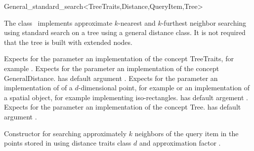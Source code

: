 

\begin{ccRefClass}{General_standard_search<TreeTraits,Distance,QueryItem,Tree>}  %


\ccDefinition
  
The class \ccRefName\ implements approximate $k$-nearest and $k$-furthest neighbor searching
using standard search on a tree using a general distance 
class. It is not required that the tree is built with extended nodes.


\ccParameters

Expects for the parameter  an implementation of the concept TreeTraits,
for example .
Expects for the parameter  an implementation of the
concept GeneralDistance.  has default argument 
.
Expects for the parameter   an implementation of
of a $d$-dimensional point, for example 
or an implementation of a spatial object, for
example  implementing iso-rectangles.
 has default argement .
Expects for the parameter  an implementation of the concept Tree.
 has default argument .

\ccTypes


\ccCreation
{}  %

{Constructor for searching approximately $k$ neighbors of the query item  
in the points stored in  using 
distance
traits class $d$ and approximation factor .}


\end{ccRefClass}
